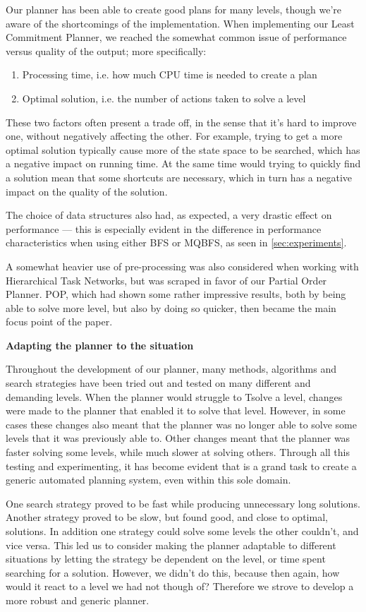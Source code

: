 \documentclass[Main]{subfiles}
\begin{document}
Our planner has been able to create good plans for many levels, though we're
aware of the shortcomings of the implementation.
When implementing our Least Commitment Planner, we reached the somewhat common
issue of performance versus quality of the output; more specifically:

\begin{enumerate}
	\item Processing time, i.e. how much CPU time is needed to create a plan
	\item Optimal solution, i.e. the number of actions taken to solve a level
\end{enumerate}

These two factors often present a trade off, in the sense that it's hard to
improve one, without negatively affecting the other. 
For example, trying to get a more optimal solution typically cause more of the
state space to be searched, which has a negative impact on running time.
At the same time would trying to quickly find a solution mean that some
shortcuts are necessary, which in turn has a negative impact on the quality of
the solution.

The choice of data structures also had, as expected, a very drastic effect on
performance ---
this is especially evident in the difference in performance characteristics when
using either BFS or MQBFS, as seen in \autoref{sec:experiments}.

A somewhat heavier use of pre-processing was also considered when working with
Hierarchical Task Networks, but was scraped in favor of our Partial Order
Planner. 
POP, which had shown some rather impressive results, both by being able to solve
more level, but also by doing so quicker, then became the main focus point of
the paper.

\textbf{Adapting the planner to the situation}

Throughout the development of our planner, many methods, algorithms and search
strategies have been tried out and tested on many different and demanding
levels. When the planner would struggle to Tsolve a level, changes were made to
the planner that enabled it to solve that level. However, in some cases these
changes also meant that the planner was no longer able to solve some levels that
it was previously able to. Other changes meant that the planner was faster
solving some levels, while much slower at solving others. Through all this
testing and experimenting, it has become evident that is a grand task to create
a generic automated planning system, even within this sole domain. 

One search strategy proved to be fast while producing unnecessary long
solutions. Another strategy proved to be slow, but found good, and close to
optimal, solutions. In addition one strategy could solve some levels the other
couldn't, and vice versa. This led us to consider making the planner adaptable
to different situations by letting the strategy be dependent on the level, or
time spent searching for a solution. However, we didn't do this, because then
again, how would it react to a level we had not though of? Therefore we strove
to develop a more robust and generic planner. 
\end{document}
